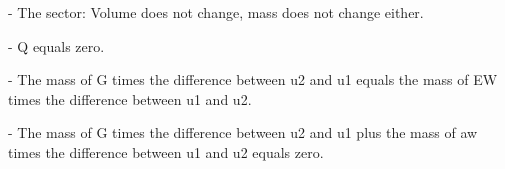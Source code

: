 - The sector: Volume does not change, mass does not change either.

- Q equals zero.

- The mass of G times the difference between u2 and u1 equals the mass of EW times the difference between u1 and u2.

- The mass of G times the difference between u2 and u1 plus the mass of aw times the difference between u1 and u2 equals zero.